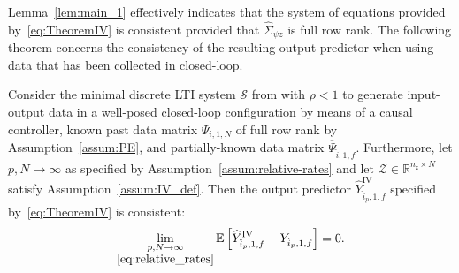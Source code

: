 Lemma~\ref{lem:main_1} effectively indicates that the system of equations provided by~\eqref{eq:TheoremIV} is consistent provided that $\hat{\Sigma}_{\psi z}$ is full row rank. The following theorem concerns the consistency of the resulting output predictor when using data that has been collected in closed-loop.
\setcounter{thm}{0}
\begin{thm}\label{theorem:main_result_IVs}
    Consider the minimal discrete \ac{LTI} system $\mathcal{S}$ from  with $\rho<1$ to generate input-output data in a well-posed closed-loop configuration by means of a causal controller, known past data matrix $\Psi_{i,1,N}$ of full row rank by Assumption~\ref{assum:PE}, and partially-known data matrix $\overline{\Psi}_{\hat{i},1,f}$. Furthermore, let $p,N\rightarrow\infty$ as specified by Assumption~\ref{assum:relative-rates} and let ${\mathcal{Z}\in\mathbb{R}^{n_\mathrm{z}\times N}}$ satisfy Assumption~\ref{assum:IV_def}. Then the output predictor $\widehat{Y}_{\hat{i}_p,1,f}^\mathrm{IV}$ specified by~\eqref{eq:TheoremIV} is consistent:
    \begin{align}\label{eq:consistent}
    \lim_{\underset{\eqref{eq:relative_rates}}{p,N\rightarrow\infty}}\mathbb{E}\left[\widehat{Y}_{\hat{i}_p,1,f}^\mathrm{IV}-Y_{\hat{i}_p,1,f}\right]=0.
    \end{align}
\end{thm}
%
